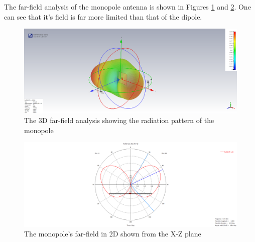 \documentclass[colorlinks,11pt,a4paper,normalphoto,withhyper,ragged2e]{altareport}
\begin{document}
The far-field analysis of the monopole antenna is shown in Figures \ref{fig:qw_ff_3d} and \ref{fig:qw_ff_2d}. One can see that it's field is far more limited than that of the dipole. \linebreak

\begin{figure}[h]
	\centering
	\hspace{\fill}\includegraphics[width=14cm,valign=c]{Images/qw-farfield-plot-3d.png}\hspace{\fill}
	\caption{The 3D far-field analysis showing the radiation pattern of the monopole}  %
	\label{fig:qw_ff_3d}
\end{figure}

\begin{figure}[h]
	\centering
	\includegraphics[width=14cm,valign=c]{Images/qw-farfield-plot-xz-plane.png}
	\caption{The monopole's far-field in 2D shown from the X-Z plane}  %
	\label{fig:qw_ff_2d}
\end{figure}
\end{document}
